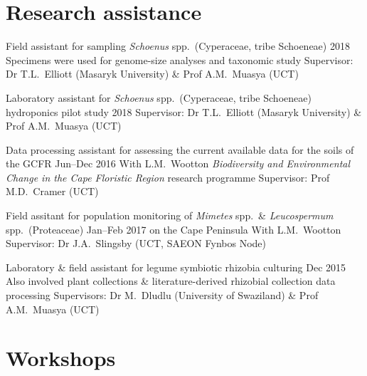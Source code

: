 \documentclass[10pt]{article}
\begin{document}
\section*{Research assistance} %

\begin{hangparas}{2em}{1}

Field assistant for sampling \textit{Schoenus} spp.~(Cyperaceae, tribe 
Schoeneae)                                                    \hfill 2018 \break
Specimens were used for genome-size analyses and taxonomic study          \break
Supervisor: Dr T.L.~Elliott (Masaryk University) \& Prof A.M.~Muasya (UCT)

Laboratory assistant for \textit{Schoenus} spp.~(Cyperaceae, tribe Schoeneae) 
hydroponics pilot study                                       \hfill 2018 \break
Supervisor: Dr T.L.~Elliott (Masaryk University) \& Prof A.M.~Muasya (UCT)

Data processing assistant for assessing the current available data for the 
soils of the GCFR                                    \hfill Jun--Dec 2016 \break
With L.M.~Wootton                                                         \break
\textit{Biodiversity and Environmental Change in the Cape Floristic Region} 
research programme                                                        \break
Supervisor: Prof M.D.~Cramer (UCT)

Field assitant for population monitoring of
  \textit{Mimetes} spp.~\&
  \textit{Leucospermum} spp.~(Proteaceae)            \hfill Jan--Feb 2017 \break
  on the Cape Peninsula                                                   \break
With L.M.~Wootton                                                         \break
Supervisor: Dr J.A.~Slingsby (UCT, SAEON Fynbos Node)

Laboratory \& field assistant for legume symbiotic rhizobia culturing
                                                          \hfill Dec 2015 \break
Also involved plant collections \& literature-derived rhizobial collection 
data processing                                                           \break
Supervisors: Dr M.~Dludlu (University of Swaziland) \& Prof A.M.~Muasya (UCT)


\hfill

\end{hangparas}

\section*{Workshops} %
\end{document}
